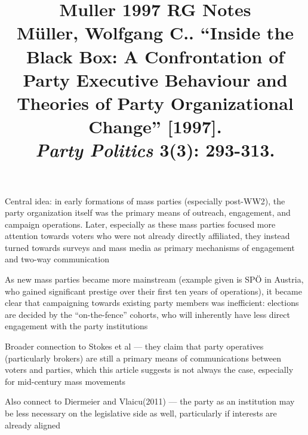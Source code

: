 \documentclass[12pt]{article}
\title{\textbf{Muller 1997 RG Notes}\\
\large Müller, Wolfgang C.. ``Inside the Black Box: A Confrontation of Party Executive Behaviour and Theories of Party Organizational Change'' [1997].\\
\textit{Party Politics} 3(3): 293-313.}
\author{}
\date{}
\begin{document}
\maketitle

Central idea: in early formations of mass parties (especially post-WW2), the party organization itself was the primary means of outreach, engagement, and campaign operations. Later, especially as these mass parties focused more attention towards voters who were not already directly affiliated, they instead turned towards surveys and mass media as primary mechanisms of engagement and two-way communication

As new mass parties became more mainstream (example given is SPÖ in Austria, who gained significant prestige over their first ten years of operations), it became clear that campaigning towards existing party members was inefficient: elections are decided by the ``on-the-fence'' cohorts, who will inherently have less direct engagement with the party institutions

Broader connection to Stokes et al --- they claim that party operatives (particularly brokers) are still a primary means of communications between voters and parties, which this article suggests is not always the case, especially for mid-century mass movements

Also connect to Diermeier and Vlaicu(2011) --- the party as an institution may be less necessary on the legislative side as well, particularly if interests are already aligned
\end{document}
